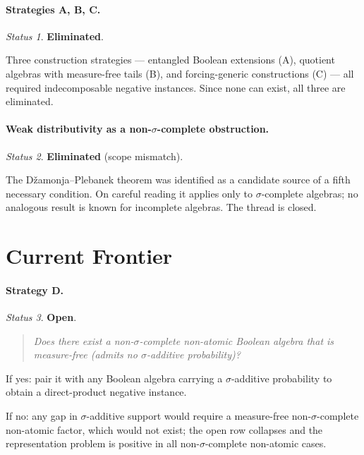 \documentclass[11pt]{article}
\theoremstyle{definition}
\theoremstyle{remark}
\newtheorem*{status}{Status}
\begin{document}
\paragraph{Strategies A, B, C.}
\begin{status}
\textbf{Eliminated}.
\end{status}
Three construction strategies --- entangled Boolean extensions (A), quotient algebras
with measure-free tails (B), and forcing-generic constructions (C) --- all required
indecomposable negative instances. Since none can exist, all three are eliminated.

\paragraph{Weak distributivity as a non-$\sigma$-complete obstruction.}
\begin{status}
\textbf{Eliminated} (scope mismatch).
\end{status}
The Dža\-monja--Plebanek theorem was identified as a candidate source of a fifth
necessary condition. On careful reading it applies only to $\sigma$-complete
algebras; no analogous result is known for incomplete algebras. The thread is closed.

\section{Current Frontier}
\label{sec:frontier}

\paragraph{Strategy D.}
\begin{status}
\textbf{Open}.
\end{status}

\begin{quote}
\textit{Does there exist a non-$\sigma$-complete non-atomic Boolean algebra that
is measure-free (admits no $\sigma$-additive probability)?}
\end{quote}

If yes: pair it with any Boolean algebra carrying a $\sigma$-additive probability
to obtain a direct-product negative instance.

If no: any gap in $\sigma$-additive support would require a measure-free
non-$\sigma$-complete non-atomic factor, which would not exist; the open row
collapses and the representation problem is positive in all non-$\sigma$-complete
non-atomic cases.
\end{document}
